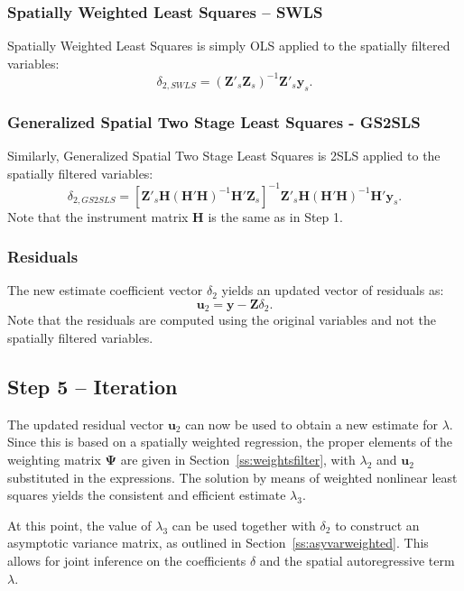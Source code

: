 \documentclass{article}
\begin{document}
\subsubsection{Spatially Weighted Least Squares -- SWLS}
Spatially Weighted Least Squares is simply OLS applied to the spatially filtered
variables:
\begin{equation}\label{eq:swls}
\delta_{2,SWLS} = ( \mathbf{Z'}_s \mathbf{Z}_s )^{-1} \mathbf{Z'}_s \mathbf{y}_s.
\end{equation}

\subsubsection{Generalized Spatial Two Stage Least Squares - GS2SLS}
Similarly, Generalized Spatial Two Stage Least Squares is 2SLS applied to the
spatially filtered variables:
\begin{equation}\label{eq:gs2sls}
\delta_{2,GS2SLS} = [ \mathbf{Z'}_s \mathbf{H} (\mathbf{H'H})^{-1} \mathbf{H'} \mathbf{Z}_s ]^{-1} \mathbf{Z'}_s \mathbf{H} (\mathbf{H'H})^{-1} \mathbf{H'} \mathbf{y}_s.
\end{equation}
Note that the instrument matrix $\mathbf{H}$ is the same as in Step 1.

\subsubsection{Residuals}
The new estimate coefficient vector $\delta_2$ yields an updated vector of residuals as:
\begin{equation*}
\mathbf{u}_2 = \mathbf{y} - \mathbf{Z} \delta_2.
\end{equation*}
Note that the residuals are computed using the original variables and not the spatially
filtered variables.

\subsection{Step 5 -- Iteration}
The updated residual vector $\mathbf{u}_2$ can now be used to obtain a new
estimate for $\lambda$. Since this is based on a spatially weighted regression,
the proper elements of the weighting matrix $\mathbf{\Psi}$ are given in 
Section~\ref{ss:weightsfilter}, with $\lambda_2$ and $\mathbf{u}_2$ substituted
in the expressions. The solution by means of weighted nonlinear least squares yields
the consistent and efficient estimate $\lambda_3$.

At this point, the value of $\lambda_3$ can be used together with $\delta_2$
to construct an asymptotic variance matrix, as outlined in Section~\ref{ss:asyvarweighted}.
This allows for joint inference on the coefficients $\delta$ and the spatial autoregressive
term $\lambda$.
\end{document}
